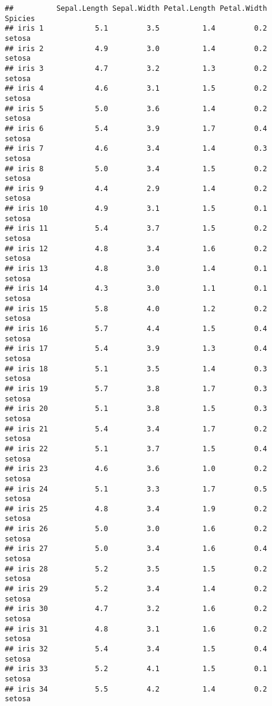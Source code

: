 \documentclass[
]{article}
\begin{document}
\begin{verbatim}
##          Sepal.Length Sepal.Width Petal.Length Petal.Width    Spicies
## iris 1            5.1         3.5          1.4         0.2     setosa
## iris 2            4.9         3.0          1.4         0.2     setosa
## iris 3            4.7         3.2          1.3         0.2     setosa
## iris 4            4.6         3.1          1.5         0.2     setosa
## iris 5            5.0         3.6          1.4         0.2     setosa
## iris 6            5.4         3.9          1.7         0.4     setosa
## iris 7            4.6         3.4          1.4         0.3     setosa
## iris 8            5.0         3.4          1.5         0.2     setosa
## iris 9            4.4         2.9          1.4         0.2     setosa
## iris 10           4.9         3.1          1.5         0.1     setosa
## iris 11           5.4         3.7          1.5         0.2     setosa
## iris 12           4.8         3.4          1.6         0.2     setosa
## iris 13           4.8         3.0          1.4         0.1     setosa
## iris 14           4.3         3.0          1.1         0.1     setosa
## iris 15           5.8         4.0          1.2         0.2     setosa
## iris 16           5.7         4.4          1.5         0.4     setosa
## iris 17           5.4         3.9          1.3         0.4     setosa
## iris 18           5.1         3.5          1.4         0.3     setosa
## iris 19           5.7         3.8          1.7         0.3     setosa
## iris 20           5.1         3.8          1.5         0.3     setosa
## iris 21           5.4         3.4          1.7         0.2     setosa
## iris 22           5.1         3.7          1.5         0.4     setosa
## iris 23           4.6         3.6          1.0         0.2     setosa
## iris 24           5.1         3.3          1.7         0.5     setosa
## iris 25           4.8         3.4          1.9         0.2     setosa
## iris 26           5.0         3.0          1.6         0.2     setosa
## iris 27           5.0         3.4          1.6         0.4     setosa
## iris 28           5.2         3.5          1.5         0.2     setosa
## iris 29           5.2         3.4          1.4         0.2     setosa
## iris 30           4.7         3.2          1.6         0.2     setosa
## iris 31           4.8         3.1          1.6         0.2     setosa
## iris 32           5.4         3.4          1.5         0.4     setosa
## iris 33           5.2         4.1          1.5         0.1     setosa
## iris 34           5.5         4.2          1.4         0.2     setosa

\end{verbatim}
\end{document}
